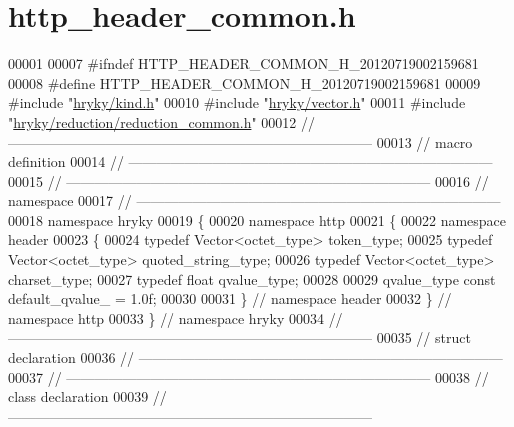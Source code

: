 \hypertarget{http__header__common_8h_source}{\section{http\-\_\-header\-\_\-common.\-h}
}

\begin{DoxyCode}
00001 
00007 \textcolor{preprocessor}{#ifndef HTTP\_HEADER\_COMMON\_H\_20120719002159681}
00008 \textcolor{preprocessor}{}\textcolor{preprocessor}{#define HTTP\_HEADER\_COMMON\_H\_20120719002159681}
00009 \textcolor{preprocessor}{}\textcolor{preprocessor}{#include "\hyperlink{kind_8h}{hryky/kind.h}"}
00010 \textcolor{preprocessor}{#include "\hyperlink{vector_8h}{hryky/vector.h}"}
00011 \textcolor{preprocessor}{#include "\hyperlink{reduction__common_8h}{hryky/reduction/reduction_common.h}"}
00012 \textcolor{comment}{//
      ------------------------------------------------------------------------------}
00013 \textcolor{comment}{// macro definition}
00014 \textcolor{comment}{//
      ------------------------------------------------------------------------------}
00015 \textcolor{comment}{//
      ------------------------------------------------------------------------------}
00016 \textcolor{comment}{// namespace}
00017 \textcolor{comment}{//
      ------------------------------------------------------------------------------}
00018 \textcolor{keyword}{namespace }hryky
00019 \{
00020 \textcolor{keyword}{namespace }http
00021 \{
00022 \textcolor{keyword}{namespace }header
00023 \{
00024     \textcolor{keyword}{typedef} Vector<octet\_type> token\_type;
00025     \textcolor{keyword}{typedef} Vector<octet\_type> quoted\_string\_type;
00026     \textcolor{keyword}{typedef} Vector<octet\_type> charset\_type;
00027     \textcolor{keyword}{typedef} \textcolor{keywordtype}{float} qvalue\_type;
00028 
00029     qvalue\_type \textcolor{keyword}{const} default\_qvalue\_ = 1.0f;
00030     
00031 \} \textcolor{comment}{// namespace header}
00032 \} \textcolor{comment}{// namespace http}
00033 \} \textcolor{comment}{// namespace hryky}
00034 \textcolor{comment}{//
      ------------------------------------------------------------------------------}
00035 \textcolor{comment}{// struct declaration}
00036 \textcolor{comment}{//
      ------------------------------------------------------------------------------}
00037 \textcolor{comment}{//
      ------------------------------------------------------------------------------}
00038 \textcolor{comment}{// class declaration}
00039 \textcolor{comment}{//
      ------------------------------------------------------------------------------}

\end{DoxyCode}
